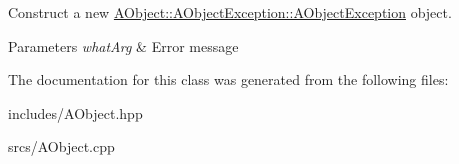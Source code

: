 Construct a new \hyperlink{class_a_object_1_1_a_object_exception_a92efc57e8b4aa4e9283b3bf124924908}{A\+Object\+::\+A\+Object\+Exception\+::\+A\+Object\+Exception} object. 


\begin{DoxyParams}{Parameters}
{\em what\+Arg} & Error message \\
\hline
\end{DoxyParams}


The documentation for this class was generated from the following files\+:\begin{DoxyCompactItemize}
\item 
includes/A\+Object.\+hpp\item 
srcs/A\+Object.\+cpp\end{DoxyCompactItemize}
